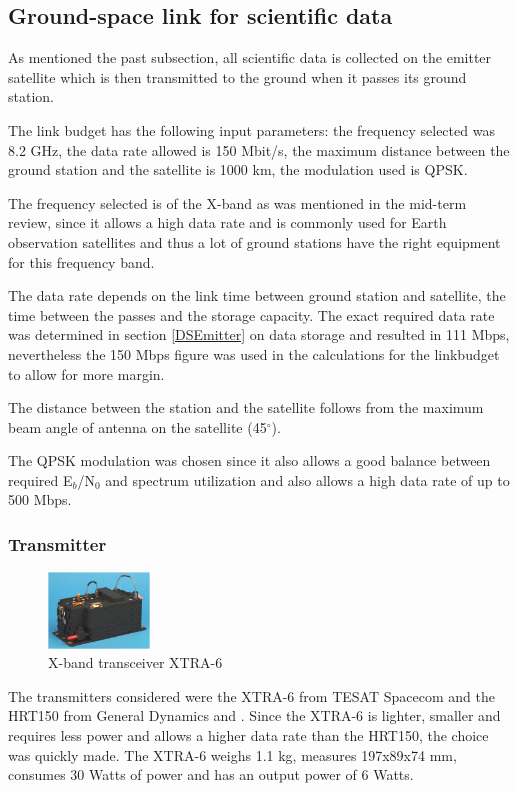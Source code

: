 \subsection{Ground-space link for scientific data}
As mentioned the past subsection, all scientific data is collected on the emitter satellite which is then transmitted to the ground when it passes its ground station.

The link budget has the following input parameters: the frequency selected was 8.2 GHz, the data rate allowed is 150 Mbit/s, the maximum distance between the ground station and the satellite is 1000 km, the modulation used is QPSK.

The frequency selected is of the X-band as was mentioned in the mid-term review, since it allows a high data rate and is commonly used for Earth observation satellites and thus a lot of ground stations have the right equipment for this frequency band.

The data rate depends on the link time between ground station and satellite, the time between the passes and the storage capacity. The exact required data rate was determined in section \ref{DSEmitter} on data storage and resulted in 111 Mbps, nevertheless the 150 Mbps figure was used in the calculations for the linkbudget to allow for more margin.

The distance between the station and the satellite follows from the maximum beam angle of antenna on the satellite (45$^{\circ}$).

The QPSK modulation was chosen since it also allows a good balance between required E$_{b}$/N$_{0}$ and spectrum utilization and also allows a high data rate of up to 500 Mbps.

\subsubsection{Transmitter}
\begin{figure}
\vspace{-50pt}
  \begin{center}
    \includegraphics[width=0.24\textwidth]{chapters/img/Xtrans.png}
  \end{center}
  \vspace{-15pt}
  \caption{X-band transceiver XTRA-6}
  \vspace{-40pt}
  \label{Xtrans}
\end{figure}
The transmitters considered were the XTRA-6 from TESAT Spacecom \cite{TESATxtra} and the HRT150 from General Dynamics and \cite{HRT150}. Since the XTRA-6 is lighter, smaller and requires less power and allows a higher data rate than the HRT150, the choice was quickly made.
The XTRA-6 weighs 1.1 kg, measures 197x89x74 mm, consumes 30 Watts of power and has an output power of 6 Watts.

